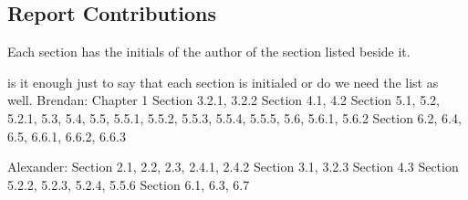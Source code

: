 \documentclass[document.tex]{subfiles}
\begin{document}
\subsection{Report Contributions}

Each section has the initials of the author of the section listed beside it.

\todo is it enough just to say that each section is initialed or do we need the list as well.
Brendan:
Chapter 1
Section 3.2.1, 3.2.2
Section 4.1, 4.2
Section 5.1, 5.2, 5.2.1, 5.3, 5.4, 5.5, 5.5.1, 5.5.2, 5.5.3, 5.5.4, 5.5.5, 5.6, 5.6.1, 5.6.2
Section 6.2, 6.4, 6.5, 6.6.1, 6.6.2, 6.6.3

Alexander:
Section 2.1, 2.2, 2.3, 2.4.1, 2.4.2
Section 3.1, 3.2.3
Section 4.3
Section 5.2.2, 5.2.3, 5.2.4, 5.5.6
Section 6.1, 6.3, 6.7
\end{document}
